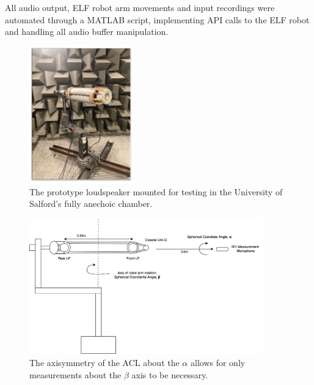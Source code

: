 \documentclass{report}
\begin{document}
        \newpage

        All audio output, ELF robot arm movements and input recordings were automated through a MATLAB script, implementing API calls to the ELF robot and handling all audio buffer manipulation.

        \begin{figure}[H]
            \centering
            \includegraphics[width = 0.4\textwidth]{figs/speakerOnRobot.png}%
            \caption{The prototype loudspeaker mounted for testing in the University of Salford's fully anechoic chamber.}
            \label{speakerOnRobot}
        \end{figure}

        \begin{figure}[H]
            \centering
            \includegraphics[width = 0.9\textwidth]{figs/speakerDiagram.png}%
            \caption{The axisymmetry of the ACL about the $\alpha$ allows for only measurements about the $\beta$ axis to be necessary.}
            \label{speakerDiagram}
        \end{figure}
\end{document}

